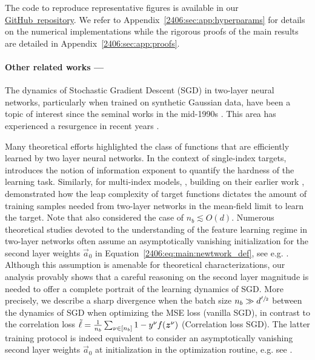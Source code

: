 The code to reproduce representative figures is available in our \href{https://github.com/IdePHICS/batch-size-time-complexity-tradeoffs}{GitHub~repository}. We refer to Appendix~\ref{2406:sec:app:hyperparams} for details on the numerical implementations while the rigorous proofs of the main results are detailed in Appendix~\ref{2406:sec:app:proofs}. 

\paragraph{Other related works ---} 
The dynamics of Stochastic Gradient Descent (SGD) in two-layer neural networks, particularly when trained on synthetic Gaussian data, have been a topic of interest since the seminal works in the mid-1990s \cite{saad1995line,saad1996dynamics,biehl1995learning,riegler1995line}. This area has experienced a resurgence in recent years \cite{tan2019online,goldt2019dynamics,veiga2022phase,arnaboldi2023high,arnaboldi2024escaping,berthier2023learning,arous2021online,paquette2022homogenization,collinswoodfin2023hitting,martin2024impact}.

Many theoretical efforts highlighted the class of functions that are efficiently learned by two layer neural networks. In the context of single-index targets, \cite{arous2021online} introduces the notion of information exponent to quantify the hardness of the learning task. Similarly, for multi-index models,  
\citep{abbe2022merged,abbe2023sgd}, building on their earlier work \citep{abbe2021staircase},
demonstrated how the leap complexity of target functions dictates the amount of training samples needed from two-layer networks in the mean-field limit to learn the target. Note that \cite{abbe2023sgd} also considered the case of $n_b \lesssim O(d)$. Numerous theoretical studies devoted to the understanding of the feature learning regime in two-layer networks often assume an asymptotically vanishing initialization for the second layer weights $\vec a_0$ in Equation~\eqref{2406:eq:main:newtwork_def}, see e.g. \citep{abbe2022merged,berthier2023learning,abbe2023sgd}. Although this assumption is amenable for theoretical characterizations, our analysis provably shows that a careful reasoning on the second layer magnitude is needed to offer a complete portrait of the learning dynamics of SGD. More precisely, we describe a sharp divergence when the batch size $n_b \gg d^{\sfrac{\ell}{2}}$ between the dynamics of SGD when optimizing the MSE loss (vanilla SGD), in contrast to the correlation loss $\Tilde{\ell} = \frac{1}{n_b}\sum_{\nu \in [n_b]} 1-y^{\nu}f(\vec z^{\nu})$ (Correlation loss SGD). The latter training protocol is indeed equivalent to consider an asymptotically vanishing second layer weights $\vec a_0$ at initialization in the optimization routine, e.g. see 
\citep{damian2023smoothing}. 




